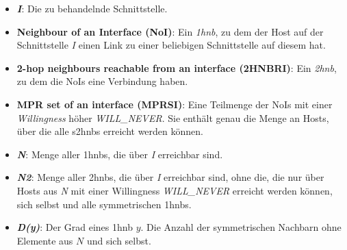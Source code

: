 \begin{itemize}
\item \textbf{\textit{I}}: Die zu behandelnde Schnittstelle.
\item \textbf{Neighbour of an Interface (NoI)}: Ein \textit{\gls{1hnb}}, zu dem der Host auf der Schnittstelle \textit{I} einen Link zu einer beliebigen Schnittstelle auf diesem hat.
\item \textbf{2-hop neighbours reachable from an interface (2HNBRI)}: Ein \textit{\gls{2hnb}}, zu dem die NoIs eine Verbindung haben.
\item \textbf{MPR set of an interface (MPRSI)}: Eine Teilmenge der NoIs mit einer \textit{Willingness} höher \textit{WILL\_NEVER}. Sie enthält genau die Menge an Hosts, über die alle \glspl{s2hnb} erreicht werden können.
\item \textbf{\textit{N}}: Menge aller \glspl{1hnb}, die über \textit{I} erreichbar sind.
\item \textbf{\textit{N2}}: Menge aller \glspl{2hnb}, die über \textit{I} erreichbar sind, ohne die, die nur über Hosts aus \textit{N} mit einer Willingness \textit{WILL\_NEVER} erreicht werden können, sich selbst und alle symmetrischen \glspl{1hnb}.
\item \textbf{\textit{D(y)}}: Der Grad eines \gls{1hnb} $y$. Die Anzahl der symmetrischen Nachbarn ohne Elemente aus $N$ und sich selbst.
\end{itemize}

%
%
%


